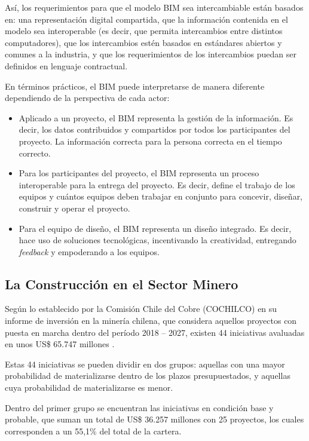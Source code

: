 Así, los requerimientos para que el modelo BIM sea intercambiable están basados en: una representación digital compartida, que la información contenida en el modelo sea interoperable (es decir, que permita intercambios entre distintos computadores), que los intercambios estén basados en estándares abiertos y comunes a la industria, y que los requerimientos de los intercambios puedan ser definidos en lenguaje contractual. %

En términos prácticos, el BIM puede interpretarse de manera diferente dependiendo de la perspectiva de cada actor:

\begin{itemize}
    \item Aplicado a un proyecto, el BIM representa la gestión de la información. Es decir, los datos contribuidos y compartidos por todos los participantes del proyecto. La información correcta para la persona correcta en el tiempo correcto.
    \item Para los participantes del proyecto, el BIM representa un proceso interoperable para la entrega del proyecto. Es decir, define el trabajo de los equipos y cuántos equipos deben trabajar en conjunto para concevir, diseñar, construir y operar el proyecto.
    \item Para el equipo de diseño, el BIM representa un diseño integrado. Es decir, hace uso de soluciones tecnológicas, incentivando la creatividad, entregando \emph{feedback} y empoderando a los equipos.
\end{itemize}

\subsection{La Construcción en el Sector Minero}

Según lo establecido por la Comisión Chile del Cobre (COCHILCO) en su informe de inversión en la minería chilena, que considera aquellos proyectos con puesta en marcha dentro del período 2018 -- 2027, existen 44 iniciativas avaluadas en unos US\$ 65.747 millones \cite{inversion-cochilco}.

Estas 44 iniciativas se pueden dividir en dos grupos: aquellas con una mayor probabilidad de materializarse dentro de los plazos presupuestados, y aquellas cuya probabilidad de materializarse es menor.

Dentro del primer grupo se encuentran las iniciativas en condición base y probable, que suman un total de US\$ 36.257 millones con 25 proyectos, los cuales corresponden a un 55,1\% del total de la cartera.

